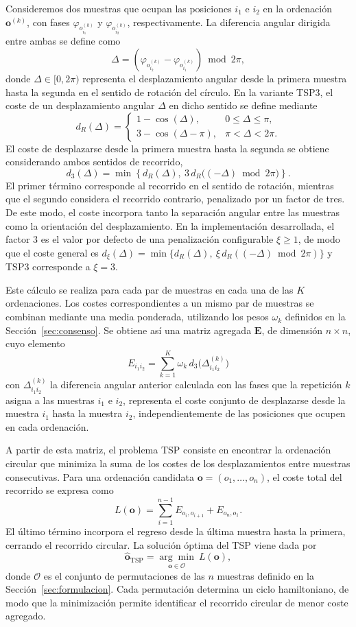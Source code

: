 \documentclass[12pt, a4paper]{report}
\begin{document}
Consideremos dos muestras que ocupan las posiciones \(i_1\) e \(i_2\) en la ordenación \(\mathbf{o}^{(k)}\), con fases \(\varphi_{o_{i_1}^{(k)}}\) y \(\varphi_{o_{i_2}^{(k)}}\), respectivamente. La diferencia angular dirigida entre ambas se define como
\[
\Delta=\left(\varphi_{o_{i_2}^{(k)}}-\varphi_{o_{i_1}^{(k)}}\right)\bmod 2\pi,
\]
donde \(\Delta\in[0,2\pi)\) representa el desplazamiento angular desde la primera muestra hasta la segunda en el sentido de rotación del círculo. En la variante TSP3, el coste de un desplazamiento angular \(\Delta\) en dicho sentido se define mediante
\[
d_R(\Delta)=
\begin{cases}
1-\cos(\Delta), & 0\leq\Delta\leq\pi,\\[2mm]
3-\cos(\Delta-\pi), & \pi<\Delta<2\pi.
\end{cases}
\]
El coste de desplazarse desde la primera muestra hasta la segunda se obtiene considerando ambos sentidos de recorrido,
\[
d_3(\Delta)=\min\left\{d_R(\Delta),\ 3\,d_R\bigl((-\Delta)\bmod 2\pi\bigr)\right\}.
\]
El primer término corresponde al recorrido en el sentido de rotación, mientras que el segundo considera el recorrido contrario, penalizado por un factor de tres. De este modo, el coste incorpora tanto la separación angular entre las muestras como la orientación del desplazamiento. En la implementación desarrollada, el factor 3 es el valor por defecto de una penalización configurable \(\xi\geq1\), de modo que el coste general es \(d_\xi(\Delta)=\min\{d_R(\Delta),\ \xi\,d_R((-\Delta)\bmod 2\pi)\}\) y TSP3 corresponde a \(\xi=3\).

Este cálculo se realiza para cada par de muestras en cada una de las \(K\) ordenaciones. Los costes correspondientes a un mismo par de muestras se combinan mediante una media ponderada, utilizando los pesos \(\omega_k\) definidos en la Sección~\ref{sec:consenso}. Se obtiene así una matriz agregada \(\mathbf{E}\), de dimensión \(n\times n\), cuyo elemento
\[
E_{i_1i_2}=\sum_{k=1}^{K}\omega_k\,d_3\bigl(\Delta^{(k)}_{i_1i_2}\bigr)
\]
con \(\Delta^{(k)}_{i_1i_2}\) la diferencia angular anterior calculada con las fases que la repetición \(k\) asigna a las muestras \(i_1\) e \(i_2\), representa el coste conjunto de desplazarse desde la muestra \(i_1\) hasta la muestra \(i_2\), independientemente de las posiciones que ocupen en cada ordenación.

A partir de esta matriz, el problema TSP consiste en encontrar la ordenación circular que minimiza la suma de los costes de los desplazamientos entre muestras consecutivas. Para una ordenación candidata \(\mathbf{o}=(o_1,\ldots,o_n)\), el coste total del recorrido se expresa como
\[
L(\mathbf{o})=\sum_{i=1}^{n-1}E_{o_i,o_{i+1}}+E_{o_n,o_1}.
\]
El último término incorpora el regreso desde la última muestra hasta la primera, cerrando el recorrido circular. La solución óptima del TSP viene dada por
\[
\widehat{\mathbf{o}}_{\mathrm{TSP}}=\underset{\mathbf{o}\in\mathcal{O}}{\arg\min}\ L(\mathbf{o}),
\]
donde \(\mathcal{O}\) es el conjunto de permutaciones de las \(n\) muestras definido en la Sección~\ref{sec:formulacion}. Cada permutación determina un ciclo hamiltoniano, de modo que la minimización permite identificar el recorrido circular de menor coste agregado.
\end{document}
